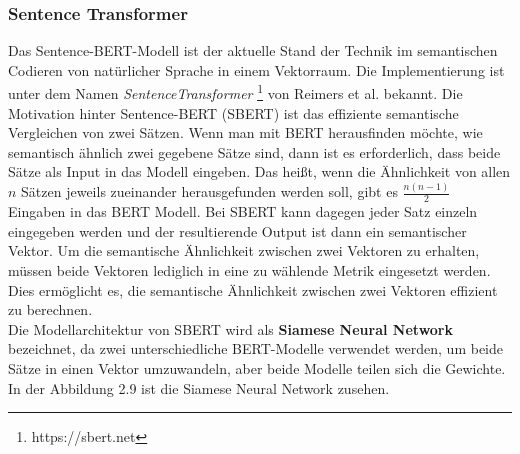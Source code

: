 \documentclass[12pt,letterpaper,ngerman]{article}
\begin{document}
\subsubsection{Sentence Transformer}
Das Sentence-BERT-Modell \cite{reimers-2019-sentence-bert}
ist der aktuelle Stand der Technik im semantischen Codieren 
von natürlicher Sprache in einem Vektorraum. Die Implementierung 
ist unter dem Namen \textit{SentenceTransformer} 
\footnote{https://sbert.net} von Reimers et al. bekannt.
Die Motivation hinter Sentence-BERT (SBERT) ist das effiziente
semantische Vergleichen 
von zwei Sätzen. Wenn man mit BERT herausfinden möchte, wie semantisch
ähnlich zwei gegebene Sätze sind, dann ist es erforderlich, dass beide
Sätze als Input in das Modell eingeben. Das heißt, wenn die Ähnlichkeit 
von allen $n$ Sätzen jeweils zueinander herausgefunden werden soll,
gibt es $\frac{n(n-1)}{2}$ Eingaben in das BERT Modell.
Bei SBERT kann dagegen jeder Satz einzeln eingegeben werden und der
resultierende Output ist dann ein semantischer Vektor. Um die
semantische Ähnlichkeit zwischen zwei Vektoren zu erhalten,
müssen beide Vektoren lediglich in eine zu wählende Metrik
eingesetzt werden. 
Dies ermöglicht es, die semantische Ähnlichkeit zwischen zwei Vektoren 
effizient zu berechnen.\\
Die Modellarchitektur von SBERT wird als {\bf Siamese Neural Network }
bezeichnet, da zwei unterschiedliche BERT-Modelle verwendet werden,
um beide Sätze in einen Vektor umzuwandeln, aber beide Modelle
teilen sich die Gewichte. In der Abbildung 2.9 ist die Siamese 
Neural Network zusehen.\\
\end{document}
